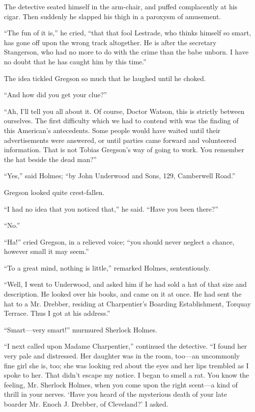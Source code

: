 \documentclass[12pt]{book}
\begin{document}
The detective seated himself in the arm-chair, and puffed complacently at his cigar. Then suddenly he slapped his thigh in a paroxysm of amusement. 

“The fun of it is,” he cried, “that that fool Lestrade, who thinks himself so smart, has gone off upon the wrong track altogether. He is after the secretary Stangerson, who had no more to do with the crime than the babe unborn. I have no doubt that he has caught him by this time.” 

The idea tickled Gregson so much that he laughed until he choked. 

“And how did you get your clue?” 

“Ah, I’ll tell you all about it. Of course, Doctor Watson, this is strictly between ourselves. The first difficulty which we had to contend with was the finding of this American’s antecedents. Some people would have waited until their advertisements were answered, or until parties came forward and volunteered information. That is not Tobias Gregson’s way of going to work. You remember the hat beside the dead man?” 

“Yes,” said Holmes; “by John Underwood and Sons, 129, Camberwell Road.” 

Gregson looked quite crest-fallen. 

“I had no idea that you noticed that,” he said. “Have you been there?” 

“No.” 

“Ha!” cried Gregson, in a relieved voice; “you should never neglect a chance, however small it may seem.” 

“To a great mind, nothing is little,” remarked Holmes, sententiously. 

“Well, I went to Underwood, and asked him if he had sold a hat of that size and description. He looked over his books, and came on it at once. He had sent the hat to a Mr. Drebber, residing at Charpentier’s Boarding Establishment, Torquay Terrace. Thus I got at his address.” 

“Smart—very smart!” murmured Sherlock Holmes. 

“I next called upon Madame Charpentier,” continued the detective. “I found her very pale and distressed. Her daughter was in the room, too—an uncommonly fine girl she is, too; she was looking red about the eyes and her lips trembled as I spoke to her. That didn’t escape my notice. I began to smell a rat. You know the feeling, Mr. Sherlock Holmes, when you come upon the right scent—a kind of thrill in your nerves. ‘Have you heard of the mysterious death of your late boarder Mr. Enoch J. Drebber, of Cleveland?’ I asked. 
\end{document}
